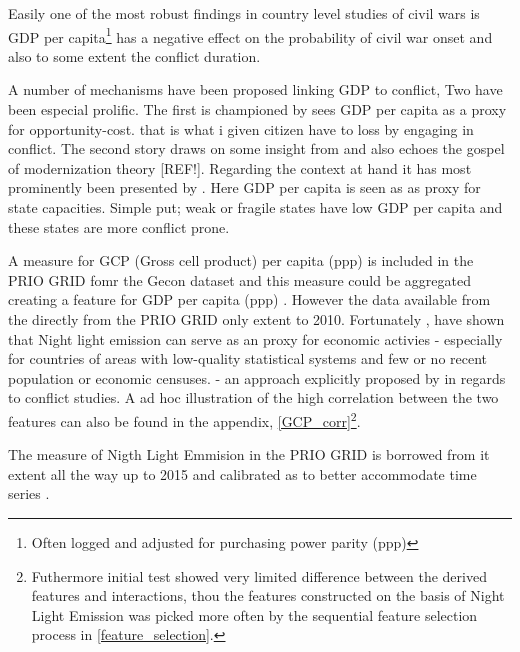 \documentclass[a4paper]{article}
\begin{document}
 Easily one of the most robust findings in country level studies of civil wars is GDP per capita\footnote{Often logged and adjusted for purchasing power parity (ppp)} has a negative effect on the probability of civil war onset \citep{Collier_Hoeffler_1998, Fearon_Laitin_2003, Collier_Hoeffler_2004, Hegre_Sambanis_2006, Blattman_Miguel_2010} and also to some extent the conflict duration\citep{Fearon_2004, Hegre_Oestby_Raleigh_2009}.\par
 
 A number of mechanisms have been proposed linking GDP to conflict, Two have been especial prolific. The first is championed by \cite{Collier_Hoeffler_1998, Collier_Hoeffler_2004} sees GDP per capita as a proxy for opportunity-cost. that is what i given citizen have to loss by engaging in conflict. The second story draws on some insight from \cite{Skocpol_1979} and also echoes the gospel of modernization theory [REF!]. Regarding the context at hand it has most prominently been presented by \cite{Fearon_Laitin_2003}. Here GDP per capita is seen as as proxy for state capacities. Simple put; weak or fragile states have low GDP per capita and these states are more conflict prone\citep[88]{Fearon_Laitin_2003}.\par
 
 A measure for GCP (Gross cell product) per capita (ppp) is included in the PRIO GRID fomr the Gecon dataset \citep{Nordhaus_2006} and this measure could be aggregated creating a feature for GDP per capita (ppp) \citep{prio_code_2015}. However the data available from the directly from the PRIO GRID only extent to 2010. Fortunately \cite{Elvidge_2009}, \cite{Chen_Nordhuas_2011} have shown that Night light emission can serve as an proxy for economic activies - especially for countries of areas with low-quality statistical systems and few or no recent population or economic censuses. \citep{Chen_Nordhuas_2011} - an approach explicitly proposed by \cite[p. 101]{Cederman_Gleditsch_Buhaug_2013} in regards to conflict studies. A ad hoc illustration of the high correlation between the two features can also be found in the appendix, \autoref{GCP_corr}\footnote{Futhermore initial test showed very limited difference between the derived features and interactions, thou the features constructed on the basis of Night Light Emission was picked more often by the sequential feature selection process in \autoref{feature_selection}.}.\par
 
 The measure of Nigth Light Emmision in the PRIO GRID is borrowed from \cite{Elvidge_2014}it extent all the way up to 2015 and calibrated as to better accommodate time series \cite{prio_code_2015}.\par %
 
\end{document}
